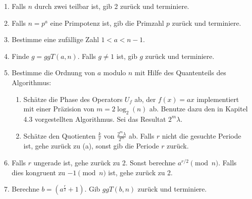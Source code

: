 \begin{enumerate}
    \item Falls $n$ durch zwei teilbar ist, gib 2 zurück und terminiere.
    \item Falls $n = p^a$ eine Primpotenz ist, gib die Primzahl $p$ zurück und terminiere.
    \item Bestimme eine zufällige Zahl $1 < a < n - 1$.
    \item Finde $g = ggT(a, n)$. Falls $g \neq 1$ ist, gib $g$ zurück und terminiere.
    \item Bestimme die Ordnung von $a$ modulo $n$ mit Hilfe des Quantenteils des Algorithmus:
    \begin{enumerate}
        \item Schätze die Phase des Operators $U_f$ ab, der $f(x) = ax$ implementiert mit einer Präzision von $m = 2\log_2(n)$ ab. Benutze dazu den in Kapitel 4.3 vorgestellten Algorithmus. Sei das Resultat $2^m\lambda$.
        \item Schätze den Quotienten $\frac{k}{r}$ von $\frac{2^m\lambda}{2^m}$ ab. Falls $r$ nicht die gesuchte Periode ist, gehe zurück zu (a), sonst gib die Periode $r$ zurück.
    \end{enumerate}
    \item Falls $r$ ungerade ist, gehe zurück zu 2. Sonst berechne $a^{r / 2} \pmod{n}$. Falls dies kongruent zu $-1 \pmod{n}$ ist, gehe zurück zu 2.
    \item Berechne $b = (a^\frac{r}{2} + 1)$. Gib $ggT(b, n)$ zurück und terminiere.
\end{enumerate}